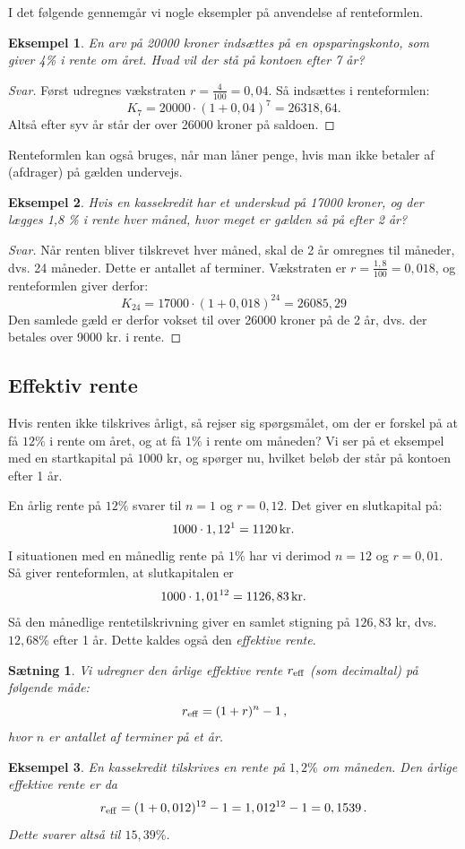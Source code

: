 \documentclass[12pt,oneside,a4paper]{article}
\theoremstyle{plain}
\newtheorem*{thm}{Sætning}
\newtheorem*{eks}{Eksempel}
\begin{document}
I det følgende gennemgår vi nogle eksempler på anvendelse af renteformlen.
\begin{eks}
    En arv på 20000 kroner indsættes på en opsparingskonto, som
    giver 4\% i rente om året. Hvad vil der stå på kontoen efter 7 år?
\end{eks}
\begin{proof}[Svar]
    Først udregnes vækstraten $r=\frac{4}{100} = 0,04$. Så indsættes i renteformlen:
    $$
    K_7 = 20000 \cdot (1 + 0,04)^7 = 26318,64.
    $$
    Altså efter syv år står der over 26000 kroner på saldoen.
\end{proof}

Renteformlen kan også bruges, når man låner penge, hvis man ikke betaler af
(afdrager) på gælden undervejs.
\begin{eks}
    Hvis en kassekredit har et underskud på 17000 kroner, og der
    lægges 1,8 \% i rente hver måned, hvor meget er gælden så på efter 2 år?
\end{eks}
\begin{proof}[Svar]
    Når renten bliver tilskrevet hver måned, skal de 2 år omregnes til
    måneder, dvs. 24 måneder. Dette er antallet af terminer. Vækstraten er $r =
    \frac{1,8}{100} = 0,018$, og renteformlen giver derfor:
    $$
    K_{24} = 17000 \cdot (1 + 0,018)^{24} = 26085,29
    $$
    Den samlede gæld er derfor vokset til over 26000 kroner på de 2 år, dvs.
    der betales over 9000 kr. i rente.
\end{proof}

\subsection*{Effektiv rente}
Hvis renten ikke tilskrives årligt, så rejser sig spørgsmålet, om der er
forskel på at få $12\%$ i rente om året, og at få $1\%$ i rente om måneden?  Vi
ser på et eksempel med en startkapital på $1000$ kr, og spørger nu, hvilket
beløb der står på kontoen efter 1 år.

En årlig rente på $12\%$ svarer til $n=1$ og $r=0,12$. Det giver en slutkapital
på:
\[
    1000 \cdot 1,12^1 = 1120 {\,\rm kr.}
\]
I situationen med en månedlig rente på $1\%$ har vi derimod $n=12$ og $r=0,01$.
Så giver renteformlen, at slutkapitalen er
\[
    1000\cdot 1,01^{12} = 1126,83 {\,\rm kr.}
\]
Så den månedlige rentetilskrivning giver en samlet stigning på $126,83$ kr, dvs.
$12,68\%$ efter 1 år. Dette kaldes også den {\em effektive rente}.
\begin{thm}
    Vi udregner den årlige effektive rente $r_{\rm eff}$ (som decimaltal) på
    følgende måde:
    \[
        r_{\rm eff} = (1+r)^n-1\,,
    \]
hvor $n$ er antallet af terminer på et år.
\end{thm}
\begin{eks}
    En kassekredit tilskrives en rente på $1,2\%$ om måneden. Den årlige
    effektive rente er da
    \[
        r_{\rm eff} = (1+0,012)^{12}-1 = 1,012^{12}-1 = 0,1539\,.
    \]
    Dette svarer altså til $15,39\%$.
\end{eks}
\end{document}
